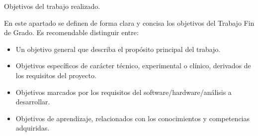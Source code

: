 
Objetivos del trabajo realizado.

En este apartado se definen de forma clara y concisa los objetivos del Trabajo Fin de Grado. 
Es recomendable distinguir entre:
\begin{itemize}
    \item Un objetivo general que describa el propósito principal del trabajo.
    \item Objetivos específicos de carácter técnico, experimental o clínico, derivados de los requisitos del proyecto.
    \item Objetivos marcados por los requisitos del software/hardware/análisis a desarrollar.
    \item Objetivos de aprendizaje, relacionados con los conocimientos y competencias adquiridas.
\end{itemize}